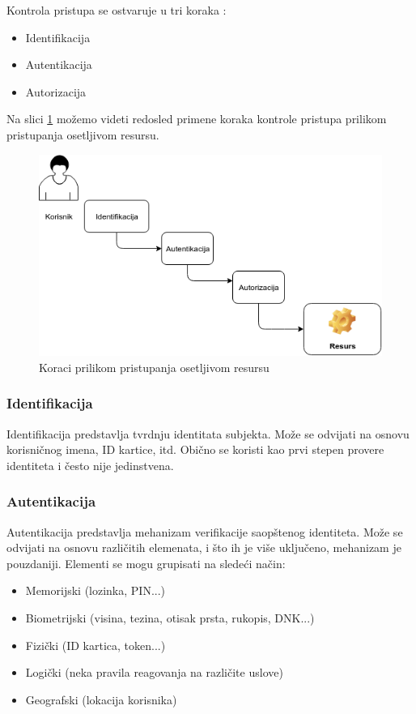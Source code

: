\documentclass[a4paper]{article}
\begin{document}
Kontrola pristupa se ostvaruje u tri koraka \cite{Top10}:
\begin{itemize}
	\item Identifikacija
	\item Autentikacija
	\item Autorizacija
\end{itemize}
Na slici \ref{slika1} možemo videti redosled primene koraka kontrole pristupa prilikom pristupanja osetljivom resursu.

\begin{figure}[h]
\begin{center}
\includegraphics[scale=0.4]{koraci}
\caption{Koraci prilikom pristupanja osetljivom resursu}
\label{slika1}
\end{center}
\end{figure}

\subsubsection{Identifikacija}

Identifikacija predstavlja tvrdnju identitata subjekta. Može se odvijati na osnovu korisničnog imena, ID kartice, itd. Obično se koristi  kao prvi stepen provere identiteta i često nije jedinstvena.

\subsubsection{Autentikacija}

Autentikacija predstavlja mehanizam verifikacije saopštenog identiteta. Može se odvijati na osnovu različitih elemenata, i što ih je više uključeno, mehanizam je pouzdaniji. Elementi se mogu grupisati na sledeći način: 
    \begin{itemize}
        \item Memorijski (lozinka, PIN...)
        \item Biometrijski (visina, tezina, otisak prsta, rukopis, DNK...)
        \item Fizički (ID kartica, token...)
        \item Logički (neka pravila reagovanja na različite uslove)                                    
        \item Geografski (lokacija korisnika)                                
    \end{itemize}
\end{document}
